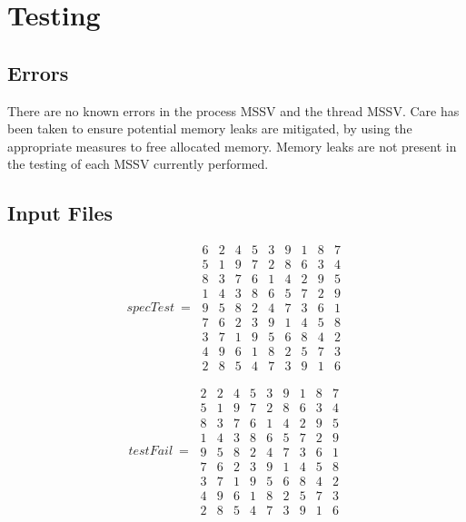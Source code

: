 \documentclass[]{article}
\begin{document}
\section{Testing}

\subsection{Errors}
There are no known errors in the process MSSV and the thread MSSV. Care has been taken to ensure potential memory leaks are mitigated, by using the appropriate measures to free allocated memory. Memory leaks are not present in the testing of each MSSV currently performed.

\subsection{Input Files}

$$
specTest\ =\  
\begin{matrix}
6 & 2 & 4 & 5 & 3 & 9 & 1 & 8 & 7 \\
5 & 1 & 9 & 7 & 2 & 8 & 6 & 3 & 4 \\
8 & 3 & 7 & 6 & 1 & 4 & 2 & 9 & 5 \\
1 & 4 & 3 & 8 & 6 & 5 & 7 & 2 & 9 \\
9 & 5 & 8 & 2 & 4 & 7 & 3 & 6 & 1 \\ 
7 & 6 & 2 & 3 & 9 & 1 & 4 & 5 & 8 \\
3 & 7 & 1 & 9 & 5 & 6 & 8 & 4 & 2 \\
4 & 9 & 6 & 1 & 8 & 2 & 5 & 7 & 3 \\
2 & 8 & 5 & 4 & 7 & 3 & 9 & 1 & 6

\end{matrix}
$$

$$
testFail\ =\  
\begin{matrix}
2 & 2 & 4 & 5 & 3 & 9 & 1 & 8 & 7 \\
5 & 1 & 9 & 7 & 2 & 8 & 6 & 3 & 4 \\
8 & 3 & 7 & 6 & 1 & 4 & 2 & 9 & 5 \\
1 & 4 & 3 & 8 & 6 & 5 & 7 & 2 & 9 \\
9 & 5 & 8 & 2 & 4 & 7 & 3 & 6 & 1 \\ 
7 & 6 & 2 & 3 & 9 & 1 & 4 & 5 & 8 \\
3 & 7 & 1 & 9 & 5 & 6 & 8 & 4 & 2 \\
4 & 9 & 6 & 1 & 8 & 2 & 5 & 7 & 3 \\
2 & 8 & 5 & 4 & 7 & 3 & 9 & 1 & 6

\end{matrix}
$$
\end{document}
